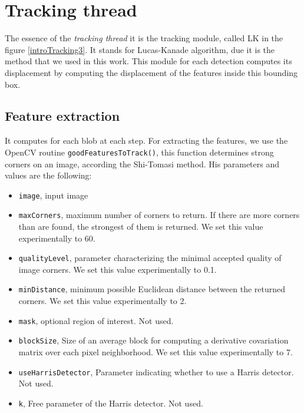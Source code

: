 \section{Tracking thread}




The essence of the \textit{tracking thread} it is the tracking module, called LK in the figure \ref{introTracking3}. It stands for Lucas-Kanade algorithm, due it is the method that we used in this work. This module for each detection computes its displacement by computing the displacement of the features inside this bounding box. 



\subsection{Feature extraction}

It computes for each blob at each step. For extracting the features, we use the OpenCV routine \texttt{goodFeaturesToTrack()}, this function determines strong corners on an image, according the Shi-Tomasi method. His parameters and values are the following:
 
\begin{itemize}

\item \texttt{image}, input image

\item \texttt{maxCorners}, maximum number of corners to return. If there are more corners than are found, the strongest of them is returned. We set this value experimentally to 60.
\item \texttt{qualityLevel}, parameter characterizing the minimal accepted quality of image corners. We set this value experimentally to 0.1.
\item \texttt{minDistance}, minimum possible Euclidean distance between the returned corners. We set this value experimentally to 2.
\item \texttt{mask}, optional region of interest. Not used.
\item \texttt{blockSize}, Size of an average block for computing a derivative covariation matrix over each pixel neighborhood. We set this value experimentally to 7.
\item \texttt{useHarrisDetector},  Parameter indicating whether to use a Harris detector. Not used.
\item \texttt{k},  Free parameter of the Harris detector. Not used.

\end{itemize}

